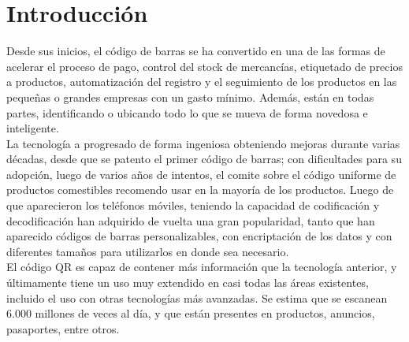 \section{Introducción}
Desde sus inicios, el código de barras se ha convertido en una de las formas de acelerar el proceso de pago, control del stock de mercancías, etiquetado de precios a productos, automatización del registro y el seguimiento de los productos en las pequeñas o grandes empresas con un gasto mínimo. Además, están en todas partes, identificando o ubicando todo lo que se mueva de forma novedosa e inteligente. 
\\
La tecnología a progresado de forma ingeniosa obteniendo mejoras durante varias décadas, desde que se patento el primer código de barras; con dificultades para su adopción, luego de varios años de intentos, el comite sobre el código uniforme de productos comestibles recomendo usar en la mayoría de los productos.  Luego de que aparecieron los teléfonos móviles, teniendo la capacidad de codificación y decodificación han adquirido de vuelta una gran popularidad, tanto que han aparecido códigos de barras personalizables, con encriptación de los datos y con diferentes tamaños para utilizarlos en donde sea necesario.
\\
El código QR es capaz de contener más información que la tecnología anterior, y últimamente tiene un uso muy extendido en casi todas las áreas existentes, incluido el uso con otras tecnologías más avanzadas. Se estima que se escanean 6.000 millones de veces al día, y que están presentes en productos, anuncios, pasaportes, entre otros. 